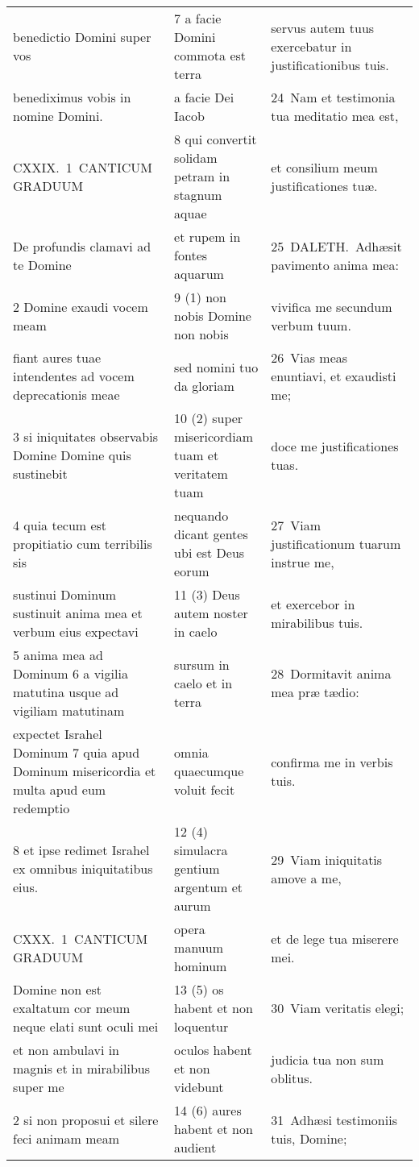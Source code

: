 \documentclass{article}
\begin{document}
\begin{longtable}{@{}p{}p{}p{}@{}}
benedictio Domini super vos	&	7 a facie Domini commota est terra	&	servus autem tuus exercebatur in justificationibus tuis.	\\
benediximus vobis in nomine Domini.	&	a facie Dei Iacob	&	24 Nam et testimonia tua meditatio mea est,	\\
CXXIX. 1 CANTICUM GRADUUM	&	8 qui convertit solidam petram in stagnum aquae	&	et consilium meum justificationes tuæ.	\\
De profundis clamavi ad te Domine	&	et rupem in fontes aquarum	&	25 DALETH. Adhæsit pavimento anima mea:	\\
2 Domine exaudi vocem meam	&	9 (1) non nobis Domine non nobis	&	vivifica me secundum verbum tuum.	\\
fiant aures tuae intendentes ad vocem deprecationis meae	&	sed nomini tuo da gloriam	&	26 Vias meas enuntiavi, et exaudisti me;	\\
3 si iniquitates observabis Domine Domine quis sustinebit	&	10 (2) super misericordiam tuam et veritatem tuam	&	doce me justificationes tuas.	\\
4 quia tecum est propitiatio cum terribilis sis	&	nequando dicant gentes ubi est Deus eorum	&	27 Viam justificationum tuarum instrue me,	\\
sustinui Dominum sustinuit anima mea et verbum eius expectavi	&	11 (3) Deus autem noster in caelo	&	et exercebor in mirabilibus tuis.	\\
5 anima mea ad Dominum 6 a vigilia matutina usque ad vigiliam matutinam	&	sursum in caelo et in terra	&	28 Dormitavit anima mea præ tædio:	\\
expectet Israhel Dominum 7 quia apud Dominum misericordia et multa apud eum redemptio	&	omnia quaecumque voluit fecit	&	confirma me in verbis tuis.	\\
8 et ipse redimet Israhel ex omnibus iniquitatibus eius.	&	12 (4) simulacra gentium argentum et aurum	&	29 Viam iniquitatis amove a me,	\\
CXXX. 1 CANTICUM GRADUUM	&	opera manuum hominum	&	et de lege tua miserere mei.	\\
Domine non est exaltatum cor meum neque elati sunt oculi mei	&	13 (5) os habent et non loquentur	&	30 Viam veritatis elegi;	\\
et non ambulavi in magnis et in mirabilibus super me	&	oculos habent et non videbunt	&	judicia tua non sum oblitus.	\\
2 si non proposui et silere feci animam meam	&	14 (6) aures habent et non audient	&	31 Adhæsi testimoniis tuis, Domine;	\\

\end{longtable}
\end{document}
